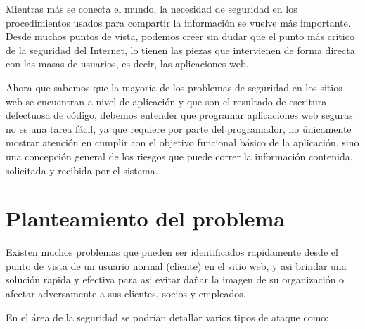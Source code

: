 \documentclass[letter,twoside,11pt]{article}
\begin{document}
Mientras más se conecta el mundo, la necesidad de seguridad en los
procedimientos usados para compartir la información se vuelve más importante.
Desde muchos puntos de vista, podemos creer sin dudar que el punto más crítico
de la seguridad del Internet, lo tienen las piezas que intervienen de forma
directa con las masas de usuarios, es decir, las aplicaciones web.

Ahora que sabemos que la mayoría de los problemas de seguridad en los sitios web
se encuentran a nivel de aplicación y que son el resultado de escritura
defectuosa de código, debemos entender que programar aplicaciones web seguras
no es una tarea fácil, ya que requiere por parte del programador, no únicamente
mostrar atención en cumplir con el objetivo funcional básico de la aplicación,
sino una concepción general de los riesgos que puede correr la información
contenida, solicitada y recibida por el sistema.

\section{Planteamiento del problema}
Existen muchos problemas que pueden ser identificados rapidamente desde el punto
de vista de un usuario normal (cliente) en el sitio web, y asi brindar una
solución rapida y efectiva para asi evitar dañar la imagen de su organización o
afectar adversamente a sus clientes, socios y empleados.

En el área de la seguridad se podrían detallar varios tipos de ataque como:
\end{document}
